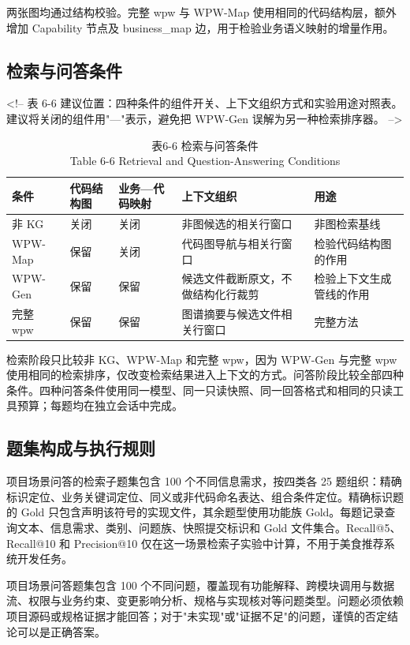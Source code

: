 两张图均通过结构校验。完整 wpw 与 WPW-Map 使用相同的代码结构层，额外增加 Capability 节点及 business\_map 边，用于检验业务语义映射的增量作用。


\subsection{检索与问答条件}
<!-- 表 6-6 建议位置：四种条件的组件开关、上下文组织方式和实验用途对照表。建议将关闭的组件用"—"表示，避免把 WPW-Gen 误解为另一种检索排序器。 -->

\begin{table}[htbp]
\centering
\small
\caption{表6-6 检索与问答条件\\Table 6-6 Retrieval and Question-Answering Conditions}
\begin{tabularx}{\textwidth}{|X|X|X|X|X|}
\hline
\textbf{条件} & \textbf{代码结构图} & \textbf{业务—代码映射} & \textbf{上下文组织} & \textbf{用途} \\
\hline
非 KG & 关闭 & 关闭 & 非图候选的相关行窗口 & 非图检索基线 \\
WPW-Map & 保留 & 关闭 & 代码图导航与相关行窗口 & 检验代码结构图的作用 \\
WPW-Gen & 保留 & 保留 & 候选文件截断原文，不做结构化行裁剪 & 检验上下文生成管线的作用 \\
完整 wpw & 保留 & 保留 & 图谱摘要与候选文件相关行窗口 & 完整方法 \\
\hline
\end{tabularx}
\end{table}

检索阶段只比较非 KG、WPW-Map 和完整 wpw，因为 WPW-Gen 与完整 wpw 使用相同的检索排序，仅改变检索结果进入上下文的方式。问答阶段比较全部四种条件。四种问答条件使用同一模型、同一只读快照、同一回答格式和相同的只读工具预算；每题均在独立会话中完成。


\subsection{题集构成与执行规则}
项目场景问答的检索子题集包含 100 个不同信息需求，按四类各 25 题组织：精确标识定位、业务关键词定位、同义或非代码命名表达、组合条件定位。精确标识题的 Gold 只包含声明该符号的实现文件，其余题型使用功能族 Gold。每题记录查询文本、信息需求、类别、问题族、快照提交标识和 Gold 文件集合。Recall@5、Recall@10 和 Precision@10 仅在这一场景检索子实验中计算，不用于美食推荐系统开发任务。

项目场景问答题集包含 100 个不同问题，覆盖现有功能解释、跨模块调用与数据流、权限与业务约束、变更影响分析、规格与实现核对等问题类型。问题必须依赖项目源码或规格证据才能回答；对于"未实现"或"证据不足"的问题，谨慎的否定结论可以是正确答案。

